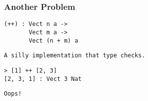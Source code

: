 \begin{frame}[fragile]
\frametitle{Another Problem}

\begin{lstlisting}[frame=single]
(++) : Vect n a ->
       Vect m a ->
       Vect (n + m) a
\end{lstlisting}

\begin{lstlisting}[frame=single]
A silly implementation that type checks.
\end{lstlisting}

\begin{lstlisting}[frame=single]
> [1] ++ [2, 3]
[2, 3, 1] : Vect 3 Nat
\end{lstlisting}

\begin{lstlisting}[frame=single]
Oops!
\end{lstlisting}

\end{frame}
